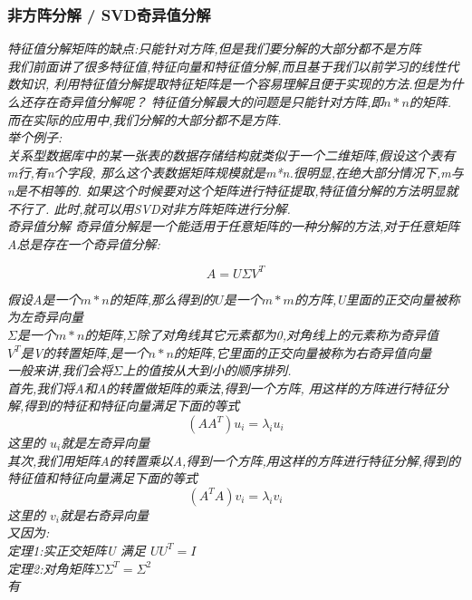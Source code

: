 \documentclass{scrartcl}
\numberwithin{equation}{section}   %
\begin{document}
\subsubsection{非方阵分解 / SVD奇异值分解}
\textsl{特征值分解矩阵的缺点:只能针对方阵,但是我们要分解的大部分都不是方阵
    \\我们前面讲了很多特征值,特征向量和特征值分解,而且基于我们以前学习的线性代数知识,
    利用特征值分解提取特征矩阵是一个容易理解且便于实现的方法.但是为什么还存在奇异值分解呢？
    特征值分解最大的问题是只能针对方阵,即$n*n$的矩阵.而在实际的应用中,我们分解的大部分都不是方阵.
    \\举个例子:
    \\关系型数据库中的某一张表的数据存储结构就类似于一个二维矩阵,假设这个表有m行,有n个字段,
    那么这个表数据矩阵规模就是m*n.很明显,在绝大部分情况下,m与n是不相等的.
    如果这个时候要对这个矩阵进行特征提取,特征值分解的方法明显就不行了.
    此时,就可以用SVD对非方阵矩阵进行分解.
    \\奇异值分解
    奇异值分解是一个能适用于任意矩阵的一种分解的方法,对于任意矩阵A总是存在一个奇异值分解:
}

\begin{equation}
    A = U \Sigma V^T
\end{equation}

\textsl{假设A是一个$m*n$的矩阵,那么得到的$U$是一个$m*m$的方阵,U里面的正交向量被称为左奇异向量\\
    $\Sigma$是一个$m*n$的矩阵,$\Sigma$除了对角线其它元素都为0,对角线上的元素称为奇异值\\
    $V^T$是V的转置矩阵,是一个$n*n$的矩阵,它里面的正交向量被称为右奇异值向量\\
    一般来讲,我们会将$\Sigma$上的值按从大到小的顺序排列.
    \\首先,我们将A和A的转置做矩阵的乘法,得到一个方阵,
    用这样的方阵进行特征分解,得到的特征和特征向量满足下面的等式
}
\begin{equation}
    (A A^T )u_i= \lambda_i u_i
\end{equation}
\textsl{这里的 $u_i$就是左奇异向量\\其次,我们用矩阵A的转置乘以A,得到一个方阵,用这样的方阵进行特征分解,得到的特征值和特征向量满足下面的等式
}
\begin{equation}
    (A^T A )v_i= \lambda_i v_i
\end{equation}
\textsl{这里的 $v_i$就是右奇异向量\\又因为:
    \\ 定理1:实正交矩阵U 满足  $U U^T =I$
    \\ 定理2:对角矩阵$\Sigma \Sigma^T = \Sigma^2$
    \\ 有
}
\end{document}
